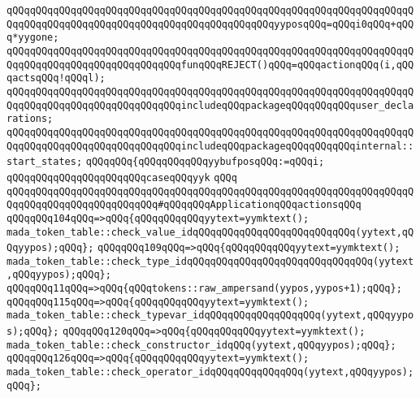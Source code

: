 \verb|qQQqqQQqqQQqqQQqqQQqqQQqqQQqqQQqqQQqqQQqqQQqqQQqqQQqqQQqqQQqqQQqqQQqqQQqqQQqqQQqqQQqqQQqqQQqqQQqqQQqqQQqqQQqqQQqqQQqyyposqQQq=qQQqi0qQQq+qQQq*yygone;|\newline
\verb|qQQqqQQqqQQqqQQqqQQqqQQqqQQqqQQqqQQqqQQqqQQqqQQqqQQqqQQqqQQqqQQqqQQqqQQqqQQqqQQqqQQqqQQqqQQqqQQqqQQqfunqQQqREJECT()qQQq=qQQqactionqQQq(i,qQQqactsqQQq!qQQql);|\newline
\verb|qQQqqQQqqQQqqQQqqQQqqQQqqQQqqQQqqQQqqQQqqQQqqQQqqQQqqQQqqQQqqQQqqQQqqQQqqQQqqQQqqQQqqQQqqQQqqQQqqQQqincludeqQQqpackageqQQqqQQqqQQquser_declarations;|\newline
\verb|qQQqqQQqqQQqqQQqqQQqqQQqqQQqqQQqqQQqqQQqqQQqqQQqqQQqqQQqqQQqqQQqqQQqqQQqqQQqqQQqqQQqqQQqqQQqqQQqqQQqincludeqQQqpackageqQQqqQQqqQQqinternal::start_states;|\newline
\verb|qQQqqQQq{qQQqqQQqqQQqyybufposqQQq:=qQQqi;|\newline
\verb|qQQqqQQqqQQqqQQqqQQqqQQqcaseqQQqyyk|\newline
\verb|qQQq|\newline
\newline
\verb|qQQqqQQqqQQqqQQqqQQqqQQqqQQqqQQqqQQqqQQqqQQqqQQqqQQqqQQqqQQqqQQqqQQqqQQqqQQqqQQqqQQqqQQqqQQqqQQq#qQQqqQQqApplicationqQQqactionsqQQq|\newline
\newline
\verb|qQQqqQQq104qQQq=>qQQq{qQQqqQQqqQQqyytext=yymktext();|\newline
\verb|mada_token_table::check_value_idqQQqqQQqqQQqqQQqqQQqqQQqqQQq(yytext,qQQqyypos);qQQq};|\newline
\verb|qQQqqQQq109qQQq=>qQQq{qQQqqQQqqQQqyytext=yymktext();|\newline
\verb|mada_token_table::check_type_idqQQqqQQqqQQqqQQqqQQqqQQqqQQqqQQq(yytext,qQQqyypos);qQQq};|\newline
\verb|qQQqqQQq11qQQq=>qQQq{qQQqtokens::raw_ampersand(yypos,yypos+1);qQQq};|\newline
\verb|qQQqqQQq115qQQq=>qQQq{qQQqqQQqqQQqyytext=yymktext();|\newline
\verb|mada_token_table::check_typevar_idqQQqqQQqqQQqqQQqqQQq(yytext,qQQqyypos);qQQq};|\newline
\verb|qQQqqQQq120qQQq=>qQQq{qQQqqQQqqQQqyytext=yymktext();|\newline
\verb|mada_token_table::check_constructor_idqQQq(yytext,qQQqyypos);qQQq};|\newline
\verb|qQQqqQQq126qQQq=>qQQq{qQQqqQQqqQQqyytext=yymktext();|\newline
\verb|mada_token_table::check_operator_idqQQqqQQqqQQqqQQq(yytext,qQQqyypos);qQQq};|\newline
